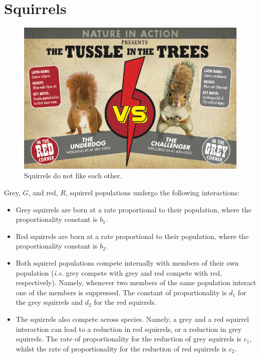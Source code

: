 \documentclass[]{article}
\newcommand{\ie}{\emph{i.e.} }
\newcommand{\tbo}{.6\textwidth}
\begin{document}
\section{Squirrels}
\begin{figure}[h!!!tb]
\centering
\includegraphics[width=\tbo]{../../Pictures/red-squirrel-v-squirrel.jpg}
\caption{Squirrels do not like each other.}
\end{figure}
Grey, $G$, and red, $R$, squirrel populations undergo the following interactions:
\begin{itemize}
\item Grey squirrels are born at a rate proportional to their population, where the proportionality constant is $b_1$.
\item Red squirrels are born at a rate proportional to their population, where the proportionality constant is $b_2$.
\item Both squirrel populations compete internally with members of their own population (\ie grey compete with grey and red compete with red, respectively). Namely, whenever two members of the same population interact one of the members is suppressed. The constant of proportionality is $d_1$ for the grey squirrels and $d_2$ for the red squirrels.
\item The squirrels also compete across species. Namely, a grey and a red squirrel interaction can lead to a reduction in red squirrels, or a reduction in grey squirrels. The rate of proportionality for the reduction of grey squirrels is $c_1$, whilst the rate of proportionality for the reduction of red squirrels is $c_2$.
\end{itemize}
\end{document}

